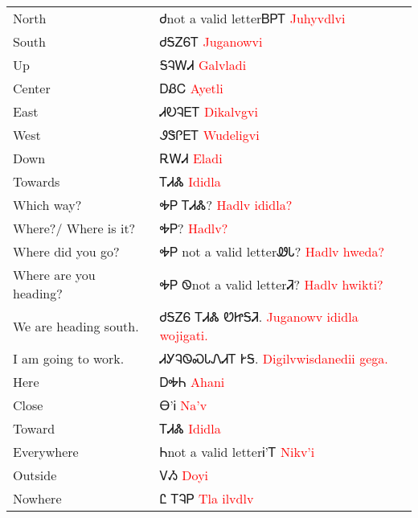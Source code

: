 \begin{minipage}{\linewidth}
\begin{tabular}{p{3cm} p{11cm}}
North & Ꮷnot a valid letterᏴᏢᎢ 
 \newline \textcolor{red}{Juhyvdlvi}\\
South & ᏧᎦᏃᏮᎢ 
 \newline \textcolor{red}{Juganowvi}\\
Up & ᎦᎸᎳᏗ 
 \newline \textcolor{red}{Galvladi}\\
Center & ᎠᏰᏟ 
 \newline \textcolor{red}{Ayetli}\\
East & ᏗᎧᎸᎬᎢ 
 \newline \textcolor{red}{Dikalvgvi}\\
West & ᏭᏕᎵᎬᎢ 
 \newline \textcolor{red}{Wudeligvi}\\
Down & ᎡᎳᏗ 
 \newline \textcolor{red}{Eladi}\\
Towards & ᎢᏗᏜ 
 \newline \textcolor{red}{Ididla}\\
Which way? & ᎭᏢ ᎢᏗᏜ? 
 \newline \textcolor{red}{Hadlv ididla?}\\
Where?/ Where is it? & ᎭᏢ? 
 \newline \textcolor{red}{Hadlv?}\\
Where did you go? & ᎭᏢ not a valid letterᏪᏓ? 
 \newline \textcolor{red}{Hadlv hweda?}\\
Where are you heading? & ᎭᏢ Ꮻnot a valid letterᏘ? 
 \newline \textcolor{red}{Hadlv hwikti?}\\
We are heading south. & ᏧᎦᏃᏮ ᎢᏗᏜ ᏬᏥᎦᏘ. 
 \newline \textcolor{red}{Juganowv ididla wojigati.}\\
I am going to work. & ᏗᎩᎸᏫᏍᏓᏁᏗᎢ ᎨᎦ. 
 \newline \textcolor{red}{Digilvwisdanedii gega.}\\
Here & ᎠᎭᏂ 
 \newline \textcolor{red}{Ahani}\\
Close & Ꮎ’Ꭵ 
 \newline \textcolor{red}{Na’v}\\
Toward & ᎢᏗᏜ 
 \newline \textcolor{red}{Ididla}\\
Everywhere & Ꮒnot a valid letterᎥ’Ꭲ 
 \newline \textcolor{red}{Nikv’i}\\
Outside & ᏙᏱ 
 \newline \textcolor{red}{Doyi}\\
Nowhere & Ꮭ ᎢᎸᏢ 
 \newline \textcolor{red}{Tla ilvdlv}\\
\end{tabular}
\end{minipage}

